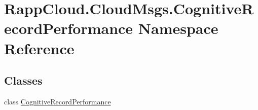 \hypertarget{namespaceRappCloud_1_1CloudMsgs_1_1CognitiveRecordPerformance}{\section{Rapp\-Cloud.\-Cloud\-Msgs.\-Cognitive\-Record\-Performance Namespace Reference}
\label{namespaceRappCloud_1_1CloudMsgs_1_1CognitiveRecordPerformance}
}
\subsection*{Classes}
\begin{DoxyCompactItemize}
\item 
class \hyperlink{classRappCloud_1_1CloudMsgs_1_1CognitiveRecordPerformance_1_1CognitiveRecordPerformance}{Cognitive\-Record\-Performance}
\end{DoxyCompactItemize}
